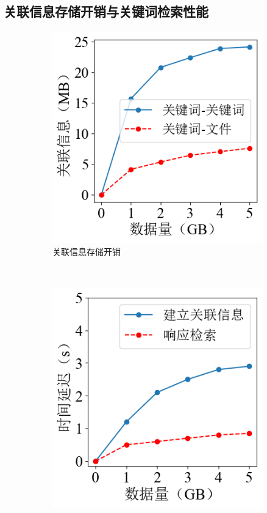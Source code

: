 \documentclass[promaster]{thesis-uestc}
\begin{document}
\subsection{关联信息存储开销与关键词检索性能}
\begin{figure}[htbp]
    \centering
    \begin{subfigure}{0.40\textwidth}
        \includegraphics[width=1\linewidth]{pic/keyword_storage.png}
        \centering
        \captionsetup{width=\textwidth}
        \caption{关联信息存储开销}
        \label{关联信息存储开销}
    \end{subfigure}\\
    \begin{subfigure}{0.40\textwidth}
        \includegraphics[width=1\linewidth]{pic/keyword_search.png}

\end{subfigure}
\end{figure}
\end{document}
